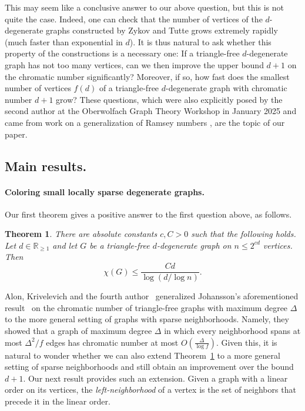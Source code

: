 \documentclass[10pt]{amsart}
\newtheorem{theorem}{Theorem}[section]
\theoremstyle{definition}
\begin{document}
This may seem like a conclusive answer to our above question, but this is not quite the case. Indeed, one can check that the number of vertices of the $d$-degenerate graphs constructed by Zykov and Tutte grows extremely rapidly (much faster than exponential in $d$). It is thus natural to ask whether this property of the constructions is a necessary one: If a triangle-free $d$-degenerate graph has not too many vertices, can we then improve the upper bound $d+1$ on the chromatic number significantly? Moreover, if so, how fast does the smallest number of vertices $f(d)$ of a triangle-free $d$-degenerate graph with chromatic number $d+1$ grow?  These questions, which were also explicitly posed by the second author at the Oberwolfach Graph Theory Workshop in January 2025 and came from work on a generalization of Ramsey numbers \cite{FoxTidorZhang}, are the topic of our paper. 

\subsection{Main results.}

\paragraph*{\textbf{Coloring small locally sparse degenerate graphs.}} Our first theorem gives a positive answer to the first question above, as follows.

\begin{theorem}\label{thm:main2}
    There are absolute constants $c,C >0$ such that the following holds. Let $d\in \mathbb{R}_{\ge 1}$ and let $G$ be a triangle-free $d$-degenerate graph on $n \le 2^{cd}$ vertices. Then \[ \chi(G) \le \frac{C d}{\log (d / \log n)}. \]
\end{theorem}

 Alon, Krivelevich and the fourth author~\cite{AKS} generalized Johansson's aforementioned result~\cite{johansson} on the chromatic number of triangle-free graphs with maximum degree $\Delta$ to the more general setting of graphs with sparse neighborhoods. Namely, they showed that a graph of maximum degree $\Delta$ in which every neighborhood spans at most $\Delta^2/f$ edges has chromatic number at most $O\left(\frac{\Delta}{\log f}\right)$. Given this, it is natural to wonder whether we can also extend Theorem~\ref{thm:main2} to a more general setting of sparse neighborhoods and still obtain an improvement over the bound $d+1$. Our next result provides such an extension. Given a graph with a linear order on its vertices, the \emph{left-neighborhood} of a vertex is the set of neighbors that precede it in the linear order. 
\end{document}
